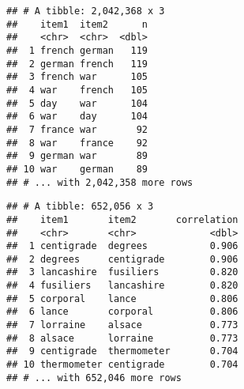\documentclass[]{article}
\newenvironment{Shaded}{\begin{snugshade}}{\end{snugshade}}
\newcommand{\DataTypeTok}[1]{\textcolor[rgb]{0.13,0.29,0.53}{#1}}
\newcommand{\DecValTok}[1]{\textcolor[rgb]{0.00,0.00,0.81}{#1}}
\newcommand{\KeywordTok}[1]{\textcolor[rgb]{0.13,0.29,0.53}{\textbf{#1}}}
\newcommand{\NormalTok}[1]{#1}
\newcommand{\OperatorTok}[1]{\textcolor[rgb]{0.81,0.36,0.00}{\textbf{#1}}}
\newcommand{\OtherTok}[1]{\textcolor[rgb]{0.56,0.35,0.01}{#1}}
\newcommand{\StringTok}[1]{\textcolor[rgb]{0.31,0.60,0.02}{#1}}
\begin{document}
\begin{Shaded}
\end{Shaded}

\begin{verbatim}
## # A tibble: 2,042,368 x 3
##    item1  item2      n
##    <chr>  <chr>  <dbl>
##  1 french german   119
##  2 german french   119
##  3 french war      105
##  4 war    french   105
##  5 day    war      104
##  6 war    day      104
##  7 france war       92
##  8 war    france    92
##  9 german war       89
## 10 war    german    89
## # ... with 2,042,358 more rows
\end{verbatim}

\begin{Shaded}
\end{Shaded}

\begin{verbatim}
## # A tibble: 652,056 x 3
##    item1       item2       correlation
##    <chr>       <chr>             <dbl>
##  1 centigrade  degrees           0.906
##  2 degrees     centigrade        0.906
##  3 lancashire  fusiliers         0.820
##  4 fusiliers   lancashire        0.820
##  5 corporal    lance             0.806
##  6 lance       corporal          0.806
##  7 lorraine    alsace            0.773
##  8 alsace      lorraine          0.773
##  9 centigrade  thermometer       0.704
## 10 thermometer centigrade        0.704
## # ... with 652,046 more rows
\end{verbatim}
\end{document}
